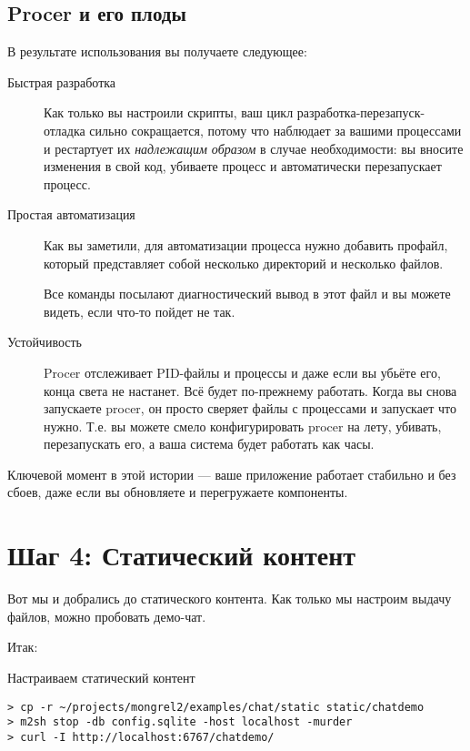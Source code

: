 \subsection{Procer и его плоды}

В результате использования  вы получаете следующее:

\begin{description}
\item [Быстрая разработка] Как только вы настроили скрипты, ваш цикл
    разработка-перезапуск-отладка сильно сокращается, потому что 
    наблюдает за вашими процессами и рестартует их \emph{надлежащим образом} в случае
    необходимости: вы вносите изменения в свой код, убиваете процесс и
     автоматически перезапускает процесс.
\item [Простая автоматизация] Как вы заметили, для автоматизации процесса нужно
    добавить профайл, который представляет собой несколько директорий и несколько
    файлов.
\item [] Все команды посылают диагностический вывод в
    этот файл и вы можете видеть, если что-то пойдет не так.
\item [Устойчивость] Procer отслеживает PID-файлы и процессы и даже если вы
    убьёте его, конца света не настанет. Всё будет по-прежнему работать. Когда вы
    снова запускаете procer, он просто сверяет файлы с процессами и запускает что
    нужно. Т.е. вы можете смело конфигурировать procer на лету, убивать,
    перезапускать его, а ваша система будет работать как часы.
\end{description}

Ключевой момент в этой истории --- ваше приложение работает стабильно и без
сбоев, даже если вы обновляете и перегружаете компоненты.

\section{Шаг 4: Статический контент}

Вот мы и добрались до статического контента. Как только мы настроим выдачу
файлов, можно пробовать демо-чат.

Итак:

\begin{code}{Настраиваем статический контент}
\begin{lstlisting}
> cp -r ~/projects/mongrel2/examples/chat/static static/chatdemo
> m2sh stop -db config.sqlite -host localhost -murder
> curl -I http://localhost:6767/chatdemo/
\end{lstlisting}
\end{code}

